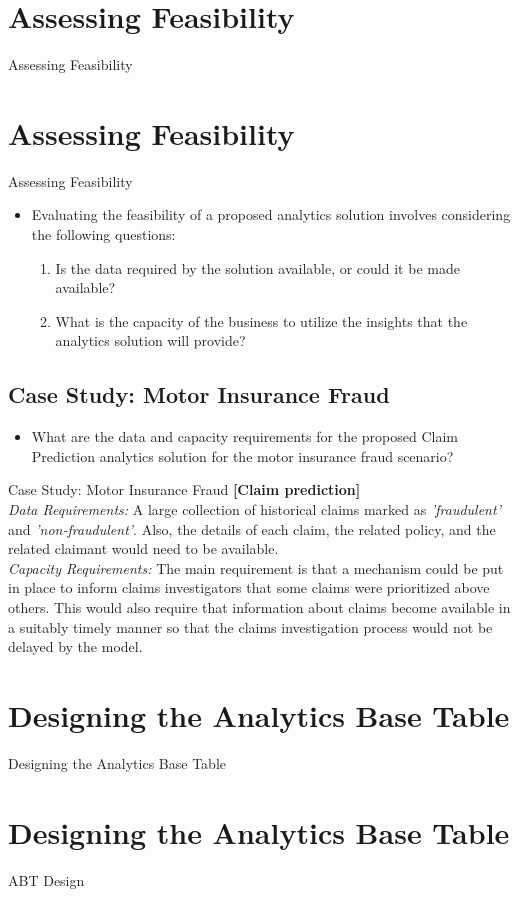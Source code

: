 \documentclass[xcolor={table}]{beamer}
\newcommand{\SectionSlide}[2][]{
	\ifthenelse{\isempty{#1}}
		{\section{#2}\begin{frame} \begin{center}\begin{huge}#2\end{huge}\end{center}\end{frame}}
		{\section[#1]{#2}\begin{frame} \begin{center}\begin{huge}#2\end{huge}\end{center}\end{frame}}
}
\newcommand{\SectionSlideShortHeader}[3][]{
	\ifthenelse{\isempty{#1}}
		{\section[#3]{#2}\begin{frame} \begin{center}\begin{huge}#2\end{huge}\end{center}\end{frame}}
		{\section[#1]{#2}\begin{frame} \begin{center}\begin{huge}#3\end{huge}\end{center}\end{frame}}
}
\newcommand{\featL}[1]{\textit{'#1'}}
\begin{document}
\SectionSlide{Assessing Feasibility}

\begin{frame}
\begin{itemize}
\item Evaluating the feasibility of a proposed analytics solution involves considering the following questions:
\begin{enumerate}
\item Is the data required by the solution available, or could it be made available? 
\item What is the capacity of the business to utilize the insights that the analytics solution will provide?
\end{enumerate}
\end{itemize}
\end{frame}

\subsection{Case Study: Motor Insurance Fraud}

\begin{frame}[plain]
\begin{itemize}
	\item What are the data and capacity requirements for the proposed Claim Prediction analytics solution for the motor insurance fraud scenario?
\end{itemize}
\pause
\begin{block}{Case Study: Motor Insurance Fraud}
\textbf{[Claim prediction]}\\
\textit{Data Requirements:} A large collection of historical claims marked as \featL{fraudulent} and \featL{non-fraudulent}. Also, the details of each claim, the related policy, and the related claimant would need to be available. 
~\\
\textit{Capacity Requirements:} The main requirement is that a mechanism could be put in place to inform claims investigators that some claims were prioritized above others. This would also require that information about claims become available in a suitably timely manner so that the claims investigation process would not be delayed by the model.
\end{block}
\end{frame}

\SectionSlideShortHeader{Designing the Analytics Base Table}{ABT Design}
 
\end{document}
